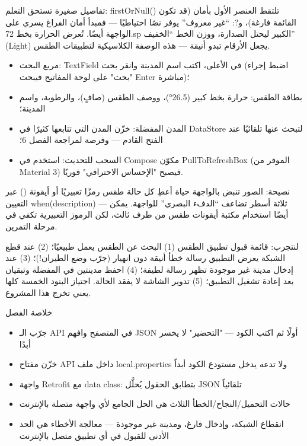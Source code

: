 تفاصيل صغيرة تستحق التعلم: firstOrNull() تلتقط العنصر الأول بأمان (قد تكون القائمة فارغة)، و?: “غير معروف” يوفر نصًا احتياطيًا — فمبدأ أمان الفراغ يسري على الواجهة أيضًا. تُعرض الحرارة بخط 72.sp الكبير ليحتل الصدارة، ووزن الخط “الخفيف” (Light) يجعل الأرقام تبدو أنيقة — هذه الوصفة الكلاسيكية لتطبيقات الطقس.



\begin{itemize}
  \item مربع البحث: TextField في الأعلى، اكتب اسم المدينة وانقر بحث (اضبط إجراء "بحث" على لوحة المفاتيح فيبحث Enter مباشرة)؛
  \item بطاقة الطقس: حرارة بخط كبير (26.5°)، ووصف الطقس (صافٍ)، والرطوبة، واسم المدينة؛
  \item المدن المفضلة: خزّن المدن التي تتابعها كثيرًا في DataStore لتبحث عنها تلقائيًا عند الفتح القادم — وفرصة لمراجعة الفصل 6؛
  \item السحب للتحديث: استخدم في Compose مكوّن PullToRefreshBox (الموفر من Material 3) فيصبح "الإحساس الاحترافي" فوريًا.
\end{itemize}

\begin{tcbinfo}{نصيحة: الصور تنبض بالواجهة حياة}
أعطِ كل حالة طقس رمزًا تعبيريًا أو أيقونة () عبر التعيين when(description) — ثلاثة أسطر تضاعف “الدفء البصري” للواجهة. يمكن أيضًا استخدام مكتبة أيقونات طقس من طرف ثالث، لكن الرموز التعبيرية تكفي في مرحلة التمرين.

\end{tcbinfo}

\begin{tcbpractice}{لنتجرب: قائمة قبول تطبيق الطقس}
(1) البحث عن الطقس يعمل طبيعيًا؛ (2) عند قطع الشبكة يعرض التطبيق رسالة خطأ أنيقة دون انهيار (جرّب وضع الطيران!)؛ (3) عند إدخال مدينة غير موجودة تظهر رسالة لطيفة؛ (4) احفظ مدينتين في المفضلة وتبقيان بعد إعادة تشغيل التطبيق؛ (5) تدوير الشاشة لا يفقد الحالة. اجتياز البنود الخمسة كلها يعني تخرج هذا المشروع.

\end{tcbpractice}

\begin{tcbsummary}{خلاصة الفصل}
\begin{itemize}
  \item جرّب الـ API في المتصفح وافهم JSON أولًا ثم اكتب الكود — "التحضير" لا يخسر أبدًا
  \item خزّن مفتاح API داخل ملف local.properties ولا تدعه يدخل مستودع الكود أبداً
  \item واجهة Retrofit مع data class: بتطابق الحقول يُحلَّل JSON تلقائياً
  \item حالات التحميل/النجاح/الخطأ الثلاث هي الحل الجامع لأي واجهة متصلة بالإنترنت
  \item انقطاع الشبكة، وإدخال فارغ، ومدينة غير موجودة — معالجة الأخطاء هي الحد الأدنى للقبول في أي تطبيق متصل بالإنترنت
\end{itemize}

\end{tcbsummary}
